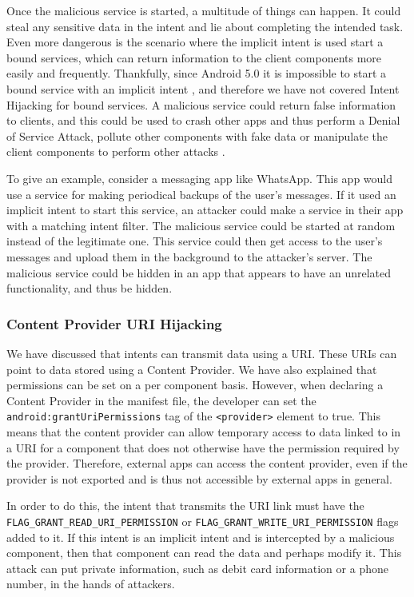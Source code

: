     Once the malicious service is started, a multitude of things can happen. It could steal any sensitive data in the intent and lie about completing the intended task. Even more dangerous is the scenario where the implicit intent is used start a bound services, which can return information to the client components more easily and frequently. Thankfully, since Android 5.0 it is impossible to start a bound service with an implicit intent \cite{bound_services}, and therefore we have not covered Intent Hijacking for bound services. A malicious service could return false information to clients, and this could be used to crash other apps and thus perform a Denial of Service Attack, pollute other components with fake data or manipulate the client components to perform other attacks \cite{2010_icc_paper}.
    
    To give an example, consider a messaging app like WhatsApp. This app would use a service for making periodical backups of the user’s messages. If it used an implicit intent to start this service, an attacker could make a service in their app with a matching intent filter. The malicious service could be started at random instead of the legitimate one. This service could then get access to the user’s messages and upload them in the background to the attacker’s server. The malicious service could be hidden in an app that appears to have an unrelated functionality, and thus be hidden.
    
    \subsubsection{Content Provider URI Hijacking}
        \label{subsubsec:provider_uri_hijacking}
        
    We have discussed that intents can transmit data using a URI. These URIs can point to data stored using a Content Provider. We have also explained that permissions can be set on a per component basis. However, when declaring a Content Provider in the manifest file, the developer can set the \lstinline|android:grantUriPermissions| tag of the \lstinline|<provider>| element to true. This means that the content provider can allow temporary access to data linked to in a URI for a component that does not otherwise have the permission required by the provider. Therefore, external apps can access the content provider, even if the provider is not exported and is thus not accessible by external apps in general.
    
    In order to do this, the intent that transmits the URI link must have the \lstinline|FLAG_GRANT_READ_URI_PERMISSION| or \lstinline|FLAG_GRANT_WRITE_URI_PERMISSION| flags added to it. If this intent is an implicit intent and is intercepted by a malicious component, then that component can read the data and perhaps modify it. This attack can put private information, such as debit card information or a phone number, in the hands of attackers.
    
